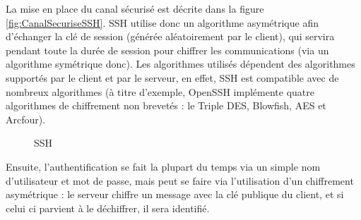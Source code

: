 La mise en place du canal sécurisé est décrite dans la figure
\ref{fig:CanalSecuriseSSH}. SSH utilise donc un algorithme asymétrique
afin d'échanger la clé de session (générée aléatoirement par le
client), qui servira pendant toute la
durée de session pour chiffrer les communications (via un
algorithme symétrique donc). Les algorithmes utilisés dépendent
des algorithmes supportés par le client et par le serveur, en
effet, SSH est compatible avec de nombreux algorithmes (à titre
d'exemple, OpenSSH implémente quatre algorithmes de chiffrement non
brevetés : le Triple DES, Blowfish, AES et Arcfour).

 
\begin{figure}[h]
\vspace{-10pt}
  \centering
    \hspace{1.2cm}
    \caption{SSH}
\end{figure}

Ensuite, l'authentification se fait la plupart du temps via un
simple nom d'utilisateur et mot de passe, mais peut se faire via
l'utilisation d'un chiffrement asymétrique : le serveur chiffre un message 
avec la clé
publique du client, et si celui ci parvient à le déchiffrer, il
sera identifié.
